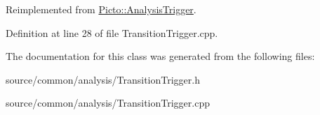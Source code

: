 Reimplemented from \hyperlink{class_picto_1_1_analysis_trigger_a05e5bb8c08c529a59bf996497ac6bdf6}{Picto\-::\-Analysis\-Trigger}.



Definition at line 28 of file Transition\-Trigger.\-cpp.



The documentation for this class was generated from the following files\-:\begin{DoxyCompactItemize}
\item 
source/common/analysis/Transition\-Trigger.\-h\item 
source/common/analysis/Transition\-Trigger.\-cpp\end{DoxyCompactItemize}
